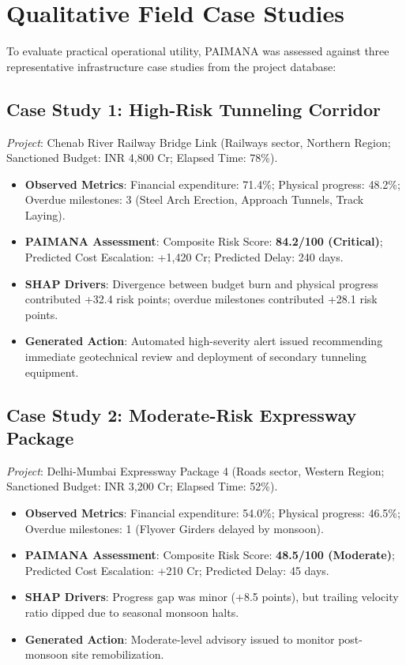 \documentclass[conference]{IEEEtran}
\begin{document}
\section{Qualitative Field Case Studies}
To evaluate practical operational utility, PAIMANA was assessed against three representative infrastructure case studies from the project database:

\subsection{Case Study 1: High-Risk Tunneling Corridor}
\textit{Project}: Chenab River Railway Bridge Link (Railways sector, Northern Region; Sanctioned Budget: INR 4,800 Cr; Elapsed Time: 78\%).
\begin{itemize}
    \item \textbf{Observed Metrics}: Financial expenditure: 71.4\%; Physical progress: 48.2\%; Overdue milestones: 3 (Steel Arch Erection, Approach Tunnels, Track Laying).
    \item \textbf{PAIMANA Assessment}: Composite Risk Score: \textbf{84.2/100 (Critical)}; Predicted Cost Escalation: +1,420 Cr; Predicted Delay: 240 days.
    \item \textbf{SHAP Drivers}: Divergence between budget burn and physical progress contributed +32.4 risk points; overdue milestones contributed +28.1 risk points.
    \item \textbf{Generated Action}: Automated high-severity alert issued recommending immediate geotechnical review and deployment of secondary tunneling equipment.
\end{itemize}

\subsection{Case Study 2: Moderate-Risk Expressway Package}
\textit{Project}: Delhi-Mumbai Expressway Package 4 (Roads sector, Western Region; Sanctioned Budget: INR 3,200 Cr; Elapsed Time: 52\%).
\begin{itemize}
    \item \textbf{Observed Metrics}: Financial expenditure: 54.0\%; Physical progress: 46.5\%; Overdue milestones: 1 (Flyover Girders delayed by monsoon).
    \item \textbf{PAIMANA Assessment}: Composite Risk Score: \textbf{48.5/100 (Moderate)}; Predicted Cost Escalation: +210 Cr; Predicted Delay: 45 days.
    \item \textbf{SHAP Drivers}: Progress gap was minor (+8.5 points), but trailing velocity ratio dipped due to seasonal monsoon halts.
    \item \textbf{Generated Action}: Moderate-level advisory issued to monitor post-monsoon site remobilization.
\end{itemize}
\end{document}
